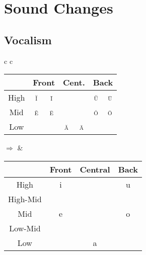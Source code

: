 \documentclass{report}
\begin{document}
\section{Sound Changes}

\subsection{Vocalism}

\begin{tcolorbox}[title=Loss of Quantity, hbox]
  \begin{tabular}{c c}
    \begin{tabular}{|c|c|c|c|c|c|c|}
      \hline
      & \multicolumn{2}{c|}{Front} & \multicolumn{2}{c|}{Cent.} & \multicolumn{2}{c|}{Back} \\
      \hline
      High & \cellcolor{gray} \textsc{\u{i}} & \textsc{\={i}} & & & \cellcolor{gray} \textsc{\u{u}} & \textsc{\={u}} \\
      \hline
      Mid & \cellcolor{gray} \textsc{\u{e}} & \textsc{\={e}} & & & \cellcolor{gray} \textsc{\u{o}} & \textsc{\={o}} \\
      \hline
      Low &  &  & \cellcolor{gray} \textsc{\u{a}} & \textsc{\={a}} & & \\
      \hline
    \end{tabular}
    \quad $\Rightarrow$ & 
                          \begin{tabular}{|c|c|c|c|}
                            \hline
                            & Front & Central & Back \\
                            \hline
                            High & i & & u \\
                            \hline
                            High-Mid & \cellcolor{magenta} \textipa{I} & & \cellcolor{magenta} \textipa{U} \\
                            \hline
                            Mid & e & & o \\
                            \hline
                            Low-Mid & \cellcolor{magenta} \textipa{E} & & \cellcolor{magenta} \textipa{O} \\
                            \hline
                            Low & & a & \\
                            \hline
                          \end{tabular}
  \end{tabular}
\end{tcolorbox}
\end{document}
